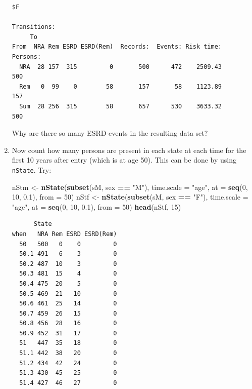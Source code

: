 \documentclass[
]{book}
\newenvironment{Shaded}{\begin{snugshade}}{\end{snugshade}}
\newcommand{\AttributeTok}[1]{\textcolor[rgb]{0.13,0.29,0.53}{#1}}
\newcommand{\DecValTok}[1]{\textcolor[rgb]{0.00,0.00,0.81}{#1}}
\newcommand{\FloatTok}[1]{\textcolor[rgb]{0.00,0.00,0.81}{#1}}
\newcommand{\FunctionTok}[1]{\textcolor[rgb]{0.13,0.29,0.53}{\textbf{#1}}}
\newcommand{\NormalTok}[1]{#1}
\newcommand{\OtherTok}[1]{\textcolor[rgb]{0.56,0.35,0.01}{#1}}
\newcommand{\SpecialCharTok}[1]{\textcolor[rgb]{0.81,0.36,0.00}{\textbf{#1}}}
\newcommand{\StringTok}[1]{\textcolor[rgb]{0.31,0.60,0.02}{#1}}
\begin{document}
\begin{enumerate}
\begin{verbatim}
$F

Transitions:
     To
From  NRA Rem ESRD ESRD(Rem)  Records:  Events: Risk time:  Persons:
  NRA  28 157  315         0       500      472    2509.43       500
  Rem   0  99    0        58       157       58    1123.89       157
  Sum  28 256  315        58       657      530    3633.32       500
\end{verbatim}

  Why are there so many ESRD-events in the resulting data set?
\item
  Now count how many persons are present in each state
  at each time for the first 10 years after entry (which is at age 50). This
  can be done by using \texttt{nState}. Try:

\begin{Shaded}
\begin{Highlighting}[]
\NormalTok{nStm }\OtherTok{\textless{}{-}} \FunctionTok{nState}\NormalTok{(}\FunctionTok{subset}\NormalTok{(sM, sex }\SpecialCharTok{==} \StringTok{"M"}\NormalTok{), }\AttributeTok{time.scale =} \StringTok{"age"}\NormalTok{, }
               \AttributeTok{at =} \FunctionTok{seq}\NormalTok{(}\DecValTok{0}\NormalTok{, }\DecValTok{10}\NormalTok{, }\FloatTok{0.1}\NormalTok{), }
             \AttributeTok{from =} \DecValTok{50}\NormalTok{)}
\NormalTok{nStf }\OtherTok{\textless{}{-}} \FunctionTok{nState}\NormalTok{(}\FunctionTok{subset}\NormalTok{(sM, sex }\SpecialCharTok{==} \StringTok{"F"}\NormalTok{), }\AttributeTok{time.scale =} \StringTok{"age"}\NormalTok{, }
               \AttributeTok{at =} \FunctionTok{seq}\NormalTok{(}\DecValTok{0}\NormalTok{, }\DecValTok{10}\NormalTok{, }\FloatTok{0.1}\NormalTok{), }
             \AttributeTok{from =} \DecValTok{50}\NormalTok{)}
\FunctionTok{head}\NormalTok{(nStf, }\DecValTok{15}\NormalTok{)}
\end{Highlighting}
\end{Shaded}

\begin{verbatim}
      State
when   NRA Rem ESRD ESRD(Rem)
  50   500   0    0         0
  50.1 491   6    3         0
  50.2 487  10    3         0
  50.3 481  15    4         0
  50.4 475  20    5         0
  50.5 469  21   10         0
  50.6 461  25   14         0
  50.7 459  26   15         0
  50.8 456  28   16         0
  50.9 452  31   17         0
  51   447  35   18         0
  51.1 442  38   20         0
  51.2 434  42   24         0
  51.3 430  45   25         0
  51.4 427  46   27         0
\end{verbatim}


\end{enumerate}
\end{document}
